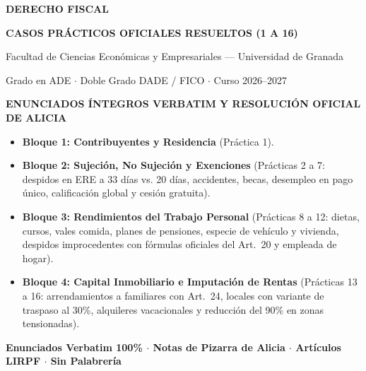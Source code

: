 \documentclass[11pt,a4paper,openany]{article}
\begin{document}
\begin{titlepage}
    \centering
    \vspace*{1.2cm}
    
    {\Huge\textbf{\textsf{\color{fiscalPrimary}DERECHO FISCAL}}\par}
    \vspace{0.35cm}
    {\Large\textbf{\textsf{\color{fiscalAccent}CASOS PRÁCTICOS OFICIALES RESUELTOS (1 A 16)}}\par}
    \vspace{0.5cm}
    {\large\textsf{Facultad de Ciencias Económicas y Empresariales --- Universidad de Granada}\par}
    \vspace{0.25cm}
    {\normalsize\textsf{Grado en ADE $\cdot$ Doble Grado DADE / FICO $\cdot$ Curso 2026--2027}\par}
    
    \vspace{1.2cm}
    
    \begin{tcolorbox}[
        enhanced,
        colback=fiscalLight,
        colframe=fiscalPrimary,
        arc=4pt,
        boxrule=1.5pt,
        width=0.96\textwidth,
        halign=center
    ]
        \vspace{0.2cm}
        {\large\bfseries\color{fiscalDark}ENUNCIADOS ÍNTEGROS VERBATIM Y RESOLUCIÓN OFICIAL DE ALICIA}\\[0.3cm]
        \normalsize
        \begin{itemize}[leftmargin=1.5cm,itemsep=3pt]
            \item \textbf{Bloque 1: Contribuyentes y Residencia} (Práctica 1).
            \item \textbf{Bloque 2: Sujeción, No Sujeción y Exenciones} (Prácticas 2 a 7: despidos en ERE a 33 días vs. 20 días, accidentes, becas, desempleo en pago único, calificación global y cesión gratuita).
            \item \textbf{Bloque 3: Rendimientos del Trabajo Personal} (Prácticas 8 a 12: dietas, cursos, vales comida, planes de pensiones, especie de vehículo y vivienda, despidos improcedentes con fórmulas oficiales del Art.~20 y empleada de hogar).
            \item \textbf{Bloque 4: Capital Inmobiliario e Imputación de Rentas} (Prácticas 13 a 16: arrendamientos a familiares con Art.~24, locales con variante de traspaso al 30\%, alquileres vacacionales y reducción del 90\% en zonas tensionadas).
        \end{itemize}
        \vspace{0.2cm}
        \textbf{\color{fiscalAccent}Enunciados Verbatim 100\% $\cdot$ Notas de Pizarra de Alicia $\cdot$ Artículos LIRPF $\cdot$ Sin Palabrería}
        \vspace{0.2cm}
    \end{tcolorbox}
    

\end{titlepage}
\end{document}
